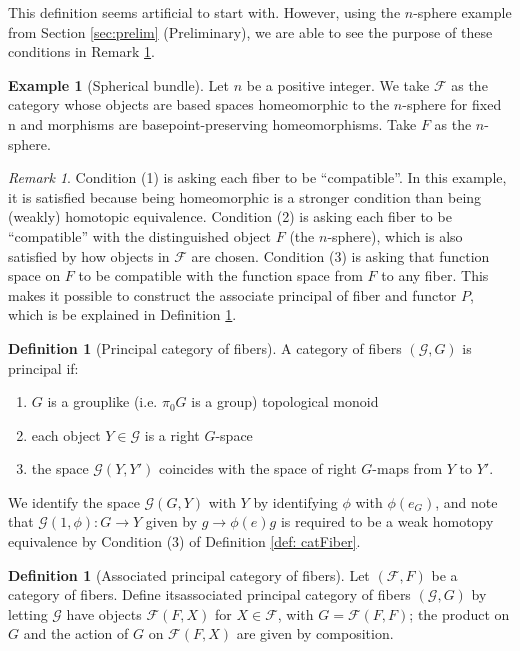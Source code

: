 \documentclass[psamsfonts]{amsart}
\theoremstyle{definition}
\newtheorem{defn}[thm]{Definition}
\newtheorem{exmp}[thm]{Example}
\theoremstyle{remark}
\newtheorem{rem}[thm]{Remark}
\numberwithin{equation}{section}
\begin{document}
This definition seems artificial to start with. However, using the $n$-sphere example from Section \ref{sec:prelim} (Preliminary), we are able to see the purpose of these conditions in Remark \ref{rem:condition}.

\begin{exmp}[Spherical bundle]
Let $n$ be a positive integer. We take $\mathcal{F}$ as the category whose objects are based spaces homeomorphic to the $n$-sphere for fixed n and morphisms are basepoint-preserving homeomorphisms. Take $F$ as the $n$-sphere. 
\end{exmp}

\begin{rem}
\label{rem:condition}
Condition (1) is asking each fiber to be ``compatible''. In this example, it is satisfied because being homeomorphic is a stronger condition than being (weakly) homotopic equivalence. Condition (2) is asking each fiber to be ``compatible'' with the distinguished object $F$ (the $n$-sphere), which is also satisfied by how objects in $\mathcal{F}$ are chosen. Condition (3) is asking that function space on $F$ to be compatible with the function space from $F$ to any fiber. This makes it possible to construct the associate principal of fiber and functor $P$, which is be explained in Definition \ref{def:asso}.
\end{rem}



\begin{defn}[Principal category of fibers]
A category of fibers $(\mathcal{G}, G)$ is principal if: 
\begin{enumerate}
    \item $G$ is a grouplike (i.e. $\pi_{0}G$ is a group) topological monoid
    \item each object $Y \in \mathcal{G}$ is a right $G$-space
    \item the space $\mathcal{G}(Y, Y')$ coincides with the space of right $G$-maps from $Y$ to $Y'$. 
\end{enumerate}
\end{defn}

We identify the space $\mathcal{G}(G, Y)$ with $Y$ by identifying $\phi$  with $\phi(e_{G})$, and note that $\mathcal{G}(1, \phi): G \rightarrow Y$ given by $g \rightarrow \phi(e)g$ is required to be a weak homotopy equivalence by Condition (3) of Definition \ref{def: catFiber}.

\begin{defn}[Associated principal category of fibers]
\label{def:asso}
Let $(\mathcal{F}, F)$ be a category of fibers. Define itsassociated principal category of fibers $(\mathcal{G}, G)$  by letting $\mathcal{G}$ have objects $\mathcal{F}(F, X)$ for $X \in \mathcal{F}$, with $G = \mathcal{F}(F, F)$; the product on $G$ and the action of $G$ on $\mathcal{F}(F, X)$ are given by composition. 
\end{defn}
\end{document}
